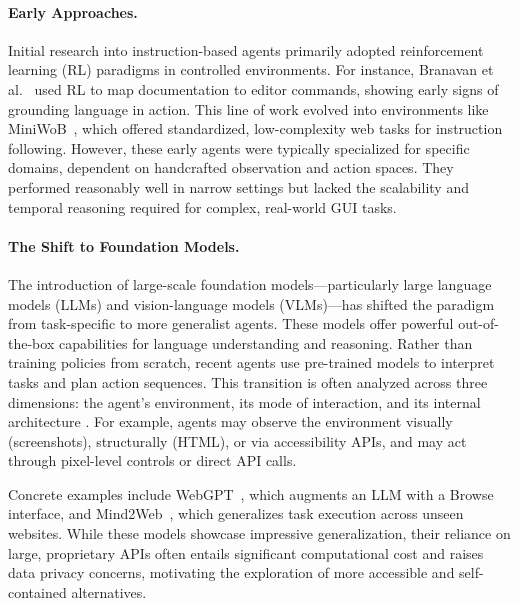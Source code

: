 \documentclass[runningheads]{llncs}
\begin{document}
\paragraph{Early Approaches.}
Initial research into instruction-based agents primarily adopted reinforcement learning (RL) paradigms in controlled environments. For instance, Branavan et al.~\cite{branavan2009learning} used RL to map documentation to editor commands, showing early signs of grounding language in action. This line of work evolved into environments like MiniWoB~\cite{shi2017world}, which offered standardized, low-complexity web tasks for instruction following. However, these early agents were typically specialized for specific domains, dependent on handcrafted observation and action spaces. They performed reasonably well in narrow settings but lacked the scalability and temporal reasoning required for complex, real-world GUI tasks.

\paragraph{The Shift to Foundation Models.}
The introduction of large-scale foundation models—particularly large language models (LLMs) and vision-language models (VLMs)—has shifted the paradigm from task-specific to more generalist agents. These models offer powerful out-of-the-box capabilities for language understanding and reasoning. Rather than training policies from scratch, recent agents use pre-trained models to interpret tasks and plan action sequences. This transition is often analyzed across three dimensions: the agent's environment, its mode of interaction, and its internal architecture \cite{chen2023survey, sager2025review}. For example, agents may observe the environment visually (screenshots), structurally (HTML), or via accessibility APIs, and may act through pixel-level controls or direct API calls.

Concrete examples include WebGPT~\cite{nakano2021webgpt}, which augments an LLM with a Browse interface, and Mind2Web~\cite{deng2023mind2web}, which generalizes task execution across unseen websites. While these models showcase impressive generalization, their reliance on large, proprietary APIs often entails significant computational cost and raises data privacy concerns, motivating the exploration of more accessible and self-contained alternatives.
\end{document}
